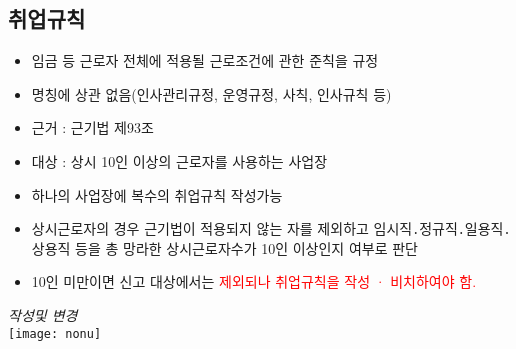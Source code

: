 \subsection{취업규칙}
\begin{itemize}[□]\tightlist
\item 임금 등 근로자 전체에 적용될  근로조건에 관한  준칙을 규정
\item 명칭에 상관 없음(인사관리규정,   운영규정, 사칙, 인사규칙 등)
\item 근거 : 근기법 제93조
\item 대상 : 상시 10인 이상의 근로자를  사용하는 사업장
\item 하나의 사업장에 복수의 취업규칙 작성가능
\item 상시근로자의 경우 근기법이 적용되지 않는 자를 제외하고 임시직․정규직․일용직․ 상용직 등을 총 망라한 상시근로자수가 10인 이상인지 여부로 판단 
\item 10인 미만이면 신고 대상에서는\textcolor{red}{ 제외되나 취업규칙을 작성 · 비치하여야 함.}
\end{itemize}
\emph{작성및 변경}\\
\texttt{[image: nonu]}

